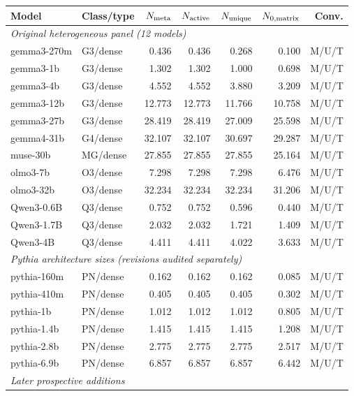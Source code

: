 \begin{table}[H]
\centering
\small
\setlength{\tabcolsep}{3pt}
\begin{tabular}{@{}llrrrrr@{}}
\toprule
Model & Class/type & $N_{\rm meta}$ & $N_{\rm active}$ & $N_{\rm unique}$ & $N_{0,\rm matrix}$ & Conv. \\
\midrule
\multicolumn{7}{l}{\textit{Original heterogeneous panel (12 models)}} \\
gemma3-270m & G3/dense & 0.436 & 0.436 & 0.268 & 0.100 & M/U/T \\
gemma3-1b & G3/dense & 1.302 & 1.302 & 1.000 & 0.698 & M/U/T \\
gemma3-4b & G3/dense & 4.552 & 4.552 & 3.880 & 3.209 & M/U/T \\
gemma3-12b & G3/dense & 12.773 & 12.773 & 11.766 & 10.758 & M/U/T \\
gemma3-27b & G3/dense & 28.419 & 28.419 & 27.009 & 25.598 & M/U/T \\
gemma4-31b & G4/dense & 32.107 & 32.107 & 30.697 & 29.287 & M/U/T \\
muse-30b & MG/dense & 27.855 & 27.855 & 27.855 & 25.164 & M/U/T \\
olmo3-7b & O3/dense & 7.298 & 7.298 & 7.298 & 6.476 & M/U/T \\
olmo3-32b & O3/dense & 32.234 & 32.234 & 32.234 & 31.206 & M/U/T \\
Qwen3-0.6B & Q3/dense & 0.752 & 0.752 & 0.596 & 0.440 & M/U/T \\
Qwen3-1.7B & Q3/dense & 2.032 & 2.032 & 1.721 & 1.409 & M/U/T \\
Qwen3-4B & Q3/dense & 4.411 & 4.411 & 4.022 & 3.633 & M/U/T \\
\midrule
\multicolumn{7}{l}{\textit{Pythia architecture sizes (revisions audited separately)}} \\
pythia-160m & PN/dense & 0.162 & 0.162 & 0.162 & 0.085 & M/U/T \\
pythia-410m & PN/dense & 0.405 & 0.405 & 0.405 & 0.302 & M/U/T \\
pythia-1b & PN/dense & 1.012 & 1.012 & 1.012 & 0.805 & M/U/T \\
pythia-1.4b & PN/dense & 1.415 & 1.415 & 1.415 & 1.208 & M/U/T \\
pythia-2.8b & PN/dense & 2.775 & 2.775 & 2.775 & 2.517 & M/U/T \\
pythia-6.9b & PN/dense & 6.857 & 6.857 & 6.857 & 6.442 & M/U/T \\
\midrule
\multicolumn{7}{l}{\textit{Later prospective additions}} \\

\end{tabular}
\end{table}
